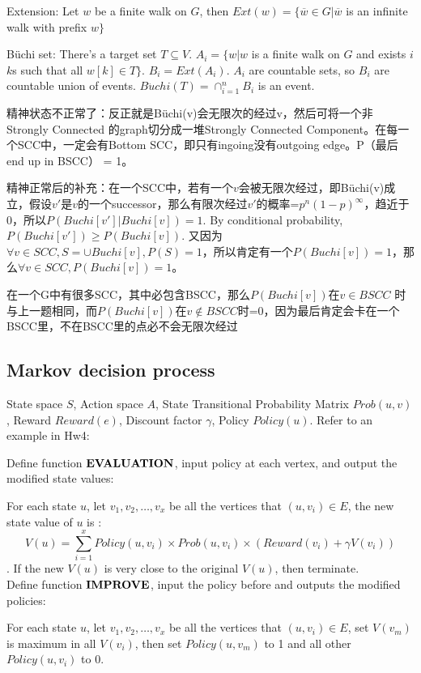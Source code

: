 \documentclass[12pt,a4paper]{ctexrep}
\begin{document}
Extension: Let $w$ be a finite walk on $G$, then $Ext(w) = \{\overline{w} \in G| \overline{w}$ is an infinite walk with prefix $w\}$

B\"uchi set: There's a target set $T\subseteq V$. $A_i = \{w|w$ is a finite walk on $G$ and exists $i$ $k$s such that all $w[k] \in T\}$. $B_i = Ext(A_i)$. $A_i$ are countable sets, so $B_i$ are countable union of events. $B\ddot{u}chi(T) = \cap_{i=1}^n B_i$ is an event.

精神状态不正常了：反正就是B\"uchi(v)会无限次的经过v，然后可将一个非Strongly Connected 的graph切分成一堆Strongly Connected Component。在每一个SCC中，一定会有Bottom SCC，即只有ingoing没有outgoing edge。P（最后end up in BSCC） = 1。%

精神正常后的补充：在一个SCC中，若有一个$v$会被无限次经过，即B\"uchi(v)成立，假设$v'$是$v$的一个successor，那么有限次经过$v'$的概率=$p^n(1-p)^{\infty}$，趋近于0，所以$P(Buchi[v']|Buchi[v])=1$. By conditional probability, $P(Buchi[v'])\geq P(Buchi[v])$. 又因为 $\forall v \in SCC, S=\cup Buchi[v], P(S)=1$，所以肯定有一个$P(Buchi[v])=1$，那么$\forall v \in SCC, P(Buchi[v])=1$。

在一个G中有很多SCC，其中必包含BSCC，那么$P(Buchi[v])$在$v\in BSCC$ 时与上一题相同，而$P(Buchi[v])$在$v \notin BSCC$时=0，因为最后肯定会卡在一个BSCC里，不在BSCC里的点必不会无限次经过

\subsection{Markov decision process}
State space $S$, Action space $A$, State Transitional Probability Matrix $Prob(u,v)$, Reward $Reward(e)$, Discount factor $\gamma$, Policy $Policy(u)$. Refer to an example in Hw4: 

Define function $\bold{EVALUATION}$, input policy at each vertex, and output the modified state values:

For each state $u$, let $v_1,v_2,\dots, v_x$ be all the vertices that $(u,v_i)\in E$, the new state value of $u$ is :\[V(u)=\sum_{i=1}^{x} Policy(u,v_i)\times Prob(u,v_i)\times (Reward(v_i)+\gamma V(v_i))\]. If the new $V(u)$ is very close to the original $V(u)$, then terminate.\\

Define function $\bold{IMPROVE}$, input the policy before and outputs the modified policies:

For each state $u$, let $v_1,v_2,\dots, v_x$ be all the vertices that $(u,v_i)\in E$, set $V(v_m)$ is maximum in all $V(v_i)$, then set $Policy(u,v_m)$ to 1 and all other $Policy(u,v_i)$ to 0. \\
\end{document}
